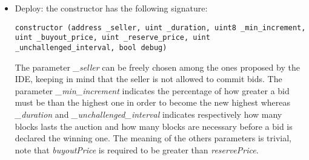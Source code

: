 \documentclass{article}
\begin{document}
\begin{itemize}
    \item Deploy: the constructor has the following signature:
        \begin{lstlisting}[language=Solidity]
constructor (address _seller, uint _duration, uint8 _min_increment, uint _buyout_price, uint _reserve_price, uint _unchallenged_interval, bool debug)
        \end{lstlisting}
        The parameter \textit{\_seller} can be freely chosen among the ones proposed by the IDE, keeping in mind that the seller is not allowed to commit bids. The parameter \textit{\_min\_increment} indicates the percentage of how greater a bid must be than the highest one in order to become the new highest whereas \textit{\_duration} and \textit{\_unchallenged\_interval} indicates respectively how many blocks lasts the auction and how many blocks are necessary before a bid is declared the winning one. The meaning of the others parameters is trivial, note that \textit{buyoutPrice} is required to be greater than \textit{reservePrice}.
        

\end{itemize}
\end{document}
